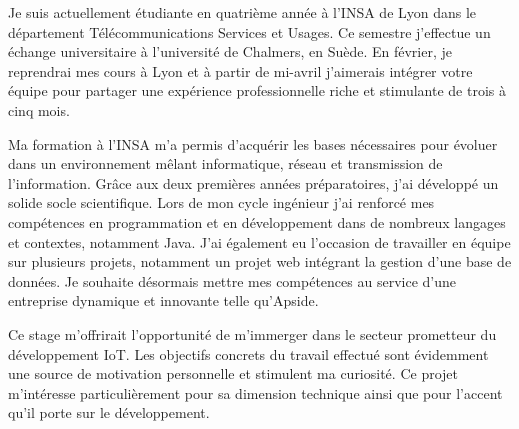 \documentclass[11pt, a4paper]{awesome-cv}
\begin{document}
\makecvheader[R]


\makelettertitle

\begin{cvletter}

Je suis actuellement étudiante en quatrième année à l'INSA de Lyon dans le département Télécommunications Services et Usages. Ce semestre j'effectue un échange universitaire à l'université de Chalmers, en Suède. En février, je reprendrai mes cours à Lyon et à partir de mi-avril j'aimerais intégrer votre équipe pour partager une expérience professionnelle riche et stimulante de trois à cinq mois.

\vspace{2mm} %

Ma formation à l'INSA m'a permis d'acquérir les bases nécessaires pour évoluer dans un environnement mêlant informatique, réseau et transmission de l'information. Grâce aux deux premières années préparatoires, j'ai développé un solide socle scientifique. Lors de mon cycle ingénieur j'ai renforcé mes compétences en programmation et en développement dans de nombreux langages et contextes, notamment Java. J'ai également eu l'occasion de travailler en équipe sur plusieurs projets, notamment un projet web intégrant la gestion d'une base de données. Je souhaite désormais mettre mes compétences au service d'une entreprise dynamique et innovante telle qu'Apside.

\vspace{2mm} %

Ce stage m'offrirait l'opportunité de m'immerger dans le secteur prometteur du développement IoT. Les objectifs concrets du travail effectué sont évidemment une source de motivation personnelle et stimulent ma curiosité. Ce projet m'intéresse particulièrement pour sa dimension technique ainsi que pour l'accent qu'il porte sur le développement.  %


\end{cvletter}
\end{document}
